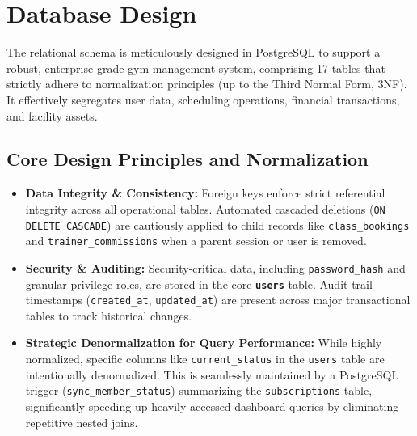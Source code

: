 \documentclass[12pt,a4paper]{article}
\begin{document}
\newpage
\section{Database Design}
The relational schema is meticulously designed in PostgreSQL to support a robust, enterprise-grade gym management system, comprising 17 tables that strictly adhere to normalization principles (up to the Third Normal Form, 3NF). It effectively segregates user data, scheduling operations, financial transactions, and facility assets.

\subsection{Core Design Principles and Normalization}
\begin{itemize}[leftmargin=*]
    \item \textbf{Data Integrity \& Consistency:} Foreign keys enforce strict referential integrity across all operational tables. Automated cascaded deletions (\texttt{ON DELETE CASCADE}) are cautiously applied to child records like \texttt{class\_bookings} and \texttt{trainer\_commissions} when a parent session or user is removed.
    \item \textbf{Security \& Auditing:} Security-critical data, including \texttt{password\_hash} and granular privilege roles, are stored in the core \textbf{\texttt{users}} table. Audit trail timestamps (\texttt{created\_at}, \texttt{updated\_at}) are present across major transactional tables to track historical changes.
    \item \textbf{Strategic Denormalization for Query Performance:} While highly normalized, specific columns like \texttt{current\_status} in the \texttt{users} table are intentionally denormalized. This is seamlessly maintained by a PostgreSQL trigger (\texttt{sync\_member\_status}) summarizing the \texttt{subscriptions} table, significantly speeding up heavily-accessed dashboard queries by eliminating repetitive nested joins.
\end{itemize}
\end{document}
